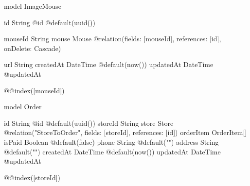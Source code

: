 model ImageMouse {
  id String @id @default(uuid())

  mouseId String
  mouse   Mouse  @relation(fields: [mouseId], references: [id], onDelete: Cascade)

  url       String
  createdAt DateTime @default(now())
  updatedAt DateTime @updatedAt

  @@index([mouseId])
}

model Order {
  id        String      @id @default(uuid())
  storeId   String
  store     Store       @relation("StoreToOrder", fields: [storeId], references: [id])
  orderItem OrderItem[]
  isPaid    Boolean     @default(false)
  phone     String      @default("")
  address   String      @default("")
  createdAt DateTime    @default(now())
  updatedAt DateTime    @updatedAt

  @@index([storeId])
}

